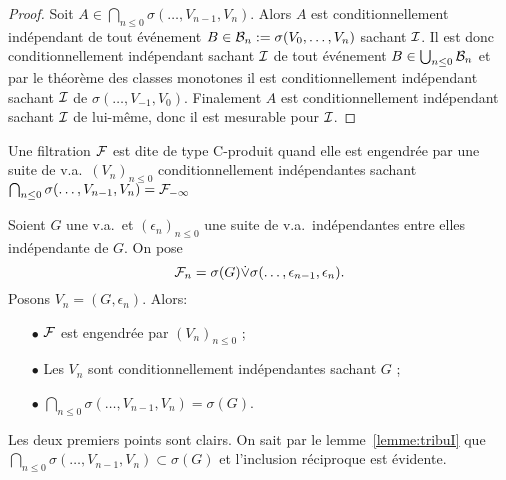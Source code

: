 \documentclass[12pt,a4paper]{article}
\begin{document}
\begin{proof}
Soit $A \in \bigcap_{n \leq 0}\sigma(\ldots, V_{n-1}, V_n)$. Alors $A$ est conditionnellement 
indépendant de tout événement 
$B \in \mathcal{B}_n := \sigma(V_0, \ldots, V_n)$ sachant 
$\mathcal{I}$. Il est donc conditionnellement 
indépendant sachant $\mathcal{I}$ de tout événement 
$B \in \bigcup_{n \leq 0}\mathcal{B}_n$ et par le théorème des classes monotones 
il est conditionnellement indépendant sachant $\mathcal{I}$ de $\sigma(\ldots, V_{-1}, V_0)$. 
Finalement $A$ est conditionnellement indépendant sachant 
$\mathcal{I}$ de lui-même, donc il est mesurable pour $\mathcal{I}$. 
\end{proof}

 

\begin{definition}
Une filtration $\mathcal{F}$ est dite de type C-produit quand elle est engendrée par 
une suite de v.a.\ ${(V_n)}_{n \leq 0}$  conditionnellement indépendantes 
sachant $\bigcap_{n \leq 0}\sigma(\ldots, V_{n-1}, V_n) = \mathcal{F}_{-\infty}$
\end{definition}

\begin{exemple}
Soient $G$ une v.a.\ et  ${(\epsilon_n)}_{n \leq 0}$ une suite de v.a.\ indépendantes 
entre elles indépendante de $G$. On pose 
$$
\mathcal{F}_n = \sigma(G) \dot{\vee} \sigma(\ldots, \epsilon_{n-1}, \epsilon_n).
$$
Posons $V_n = (G, \epsilon_n)$. 
Alors: 
\begin{itemize}
\item[$\bullet$]  $\mathcal{F}$ est engendrée par  ${(V_n)}_{n \leq 0}$ ; 

\item[$\bullet$] Les $V_n$ sont conditionnellement indépendantes sachant $G$ ;

\item[$\bullet$]  $\bigcap_{n \leq 0}\sigma(\ldots, V_{n-1}, V_n) = \sigma(G)$.
\end{itemize}
Les deux premiers points sont clairs. 
On sait par le lemme~\ref{lemme:tribuI} que 
$\bigcap_{n \leq 0}\sigma(\ldots, V_{n-1}, V_n) \subset \sigma(G)$ et l'inclusion 
réciproque est évidente.
\end{exemple}
\end{document}
